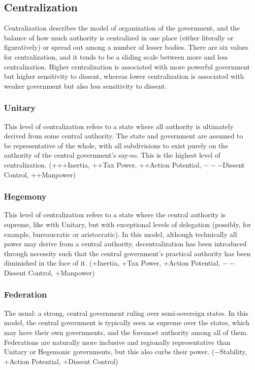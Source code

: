 \documentclass[11 pt]{scrartcl}
\begin{document}
\subsection{Centralization}

Centralization describes the model of organization of the government, and the balance of how much authority is centralized in one place (either literally or figuratively) or spread out among a number of lesser bodies. There are six values for centralization, and it tends to be a sliding scale between more and less centralization. Higher centralization is associated with more powerful government but higher sensitivity to dissent, whereas lower centralization is associated with weaker government but also less sensitivity to dissent.

\subsubsection*{Unitary}

This level of centralization refers to a state where all authority is ultimately derived from some central authority. The state and government are assumed to be representative of the whole, with all subdivisions to exist purely on the authority of the central government’s say-so. This is the highest level of centralization. (+++Inertia, ++Tax Power, ++Action Potential, $---$Dissent Control, ++Manpower)

\subsubsection*{Hegemony}
 
This level of centralization refers to a state where the central authority is supreme, like with Unitary, but with exceptional levels of delegation (possibly, for example, bureaucratic or aristocratic). In this model, although technically all power may derive from a central authority, decentralization has been introduced through necessity such that the central government’s practical authority has been diminished in the face of it. (+Inertia, +Tax Power, +Action Potential, $--$Dissent Control, +Manpower)

\subsubsection*{Federation}

The usual: a strong, central government ruling over semi-sovereign states. In this model, the central government is typically seen as supreme over the states, which may have their own governments, and the foremost authority among all of them. Federations are naturally more inclusive and regionally representative than Unitary or Hegemonic governments, but this also curbs their power. ($-$Stability, +Action Potential, +Dissent Control)
\end{document}
